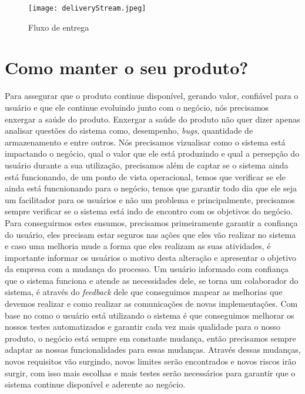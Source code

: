       \begin{figure}[!h]
        \centering
        \texttt{[image: deliveryStream.jpeg]}
        \caption{Fluxo de entrega}
        \label{Imagem:4}
      \end{figure}

  \chapter{Como manter o seu produto?}
    Para assegurar que o produto continue disponível, gerando valor, confiável
    para o usuário e que ele continue evoluindo junto com o negócio, nós
    precisamos enxergar a saúde do produto. Enxergar a saúde do produto não quer
    dizer apenas analisar questões do sistema como, desempenho, \textit{bugs},
    quantidade de armazenamento e entre outros. Nós precisamos vizualisar como o
    sistema está impactando o negócio, qual o valor que ele está produzindo e
    qual a persepção do usuário durante a sua utilização, precisamos além de
    captar se o sistema ainda está funcionando, de um ponto de vista operacional,
    temos que verificar se ele ainda está funcnionando para o negócio, temos que
    garantir todo dia que ele seja um facilitador para os usuários e não um
    problema e principalmente, precisamos sempre verificar se o sistema está indo
    de encontro com os objetivos do negócio. \newline
    Para conseguirmos estes ensumos, precisamos primeiramente garantir a confiança
    do usuário, eles precisam estar seguros nas ações que eles vão realizar no
    sistema e caso uma melhoria mude a forma que eles realizam as suas atividades,
    é importante informar os usuários o motivo desta alteração e apresentar o
    objetivo da empresa com a mudança do processo. Um usuário informado com
    confiança que o sistema funciona e atende as necessidades dele, se torna
    um colaborador do sistema, é através do \textit{feedback} dele que conseguimos
    mapear as melhorias que devemos realizar e como realizar as comunicações de
    novas implementações. Com base no como o usuário está utilizando o sistema
    é que conseguimos melhorar os nossos testes automatizados e garantir cada vez
    mais qualidade para o nosso produto, o negócio está sempre em constante
    mudança, então precisamos sempre adaptar as nossas funcionalidades para essas
    mudanças. Através dessas mudanças, novos requisitos vão surgindo, novos
    limites serão encontrados e novos riscos irão surgir, com isso mais escolhas
    e mais testes serão necessários para garantir que o sistema continue
    disponível e aderente ao negócio.

